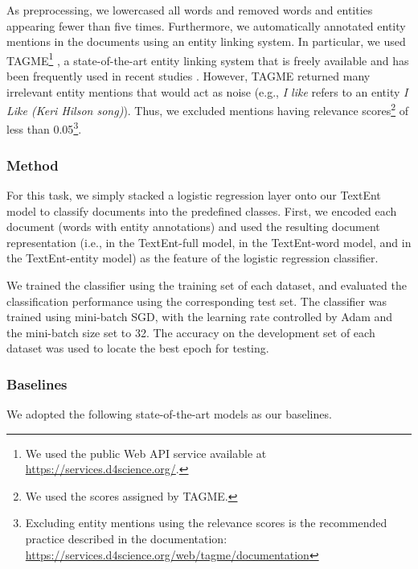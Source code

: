 \documentclass[11pt]{article}
\begin{document}
  As preprocessing, we lowercased all words and removed words and entities appearing fewer than five times.
  Furthermore, we automatically annotated entity mentions in the documents using an entity linking system.
  In particular, we used TAGME\footnote{We used the public Web API service available at \url{https://services.d4science.org/}.} \cite{Ferragina2010}, a state-of-the-art entity linking system that is freely available and has been frequently used in recent studies \cite{Xiong2016,Hasibi2016}.
  However, TAGME returned many irrelevant entity mentions that would act as noise (e.g., \textit{I like} refers to an entity \textit{I Like (Keri Hilson song)}).
  Thus, we excluded mentions having relevance scores\footnote{We used the  scores assigned by TAGME.} of less than 0.05\footnote{Excluding entity mentions using the relevance scores is the recommended practice described in the documentation: \url{https://services.d4science.org/web/tagme/documentation}}.

  \subsubsection*{Method}

  For this task, we simply stacked a logistic regression layer onto our TextEnt model to classify documents into the predefined classes.
  First, we encoded each document (words with entity annotations) and used the resulting document representation (i.e.,  in the TextEnt-full model,  in the TextEnt-word model, and  in the TextEnt-entity model) as the feature of the logistic regression classifier.

  We trained the classifier using the training set of each dataset, and evaluated the classification performance using the corresponding test set.
  The classifier was trained using mini-batch SGD, with the learning rate controlled by Adam \cite{kingma2014adam} and the mini-batch size set to 32.
  The accuracy on the development set of each dataset was used to locate the best epoch for testing.

  \subsubsection*{Baselines}

  We adopted the following state-of-the-art models as our baselines.
\end{document}
